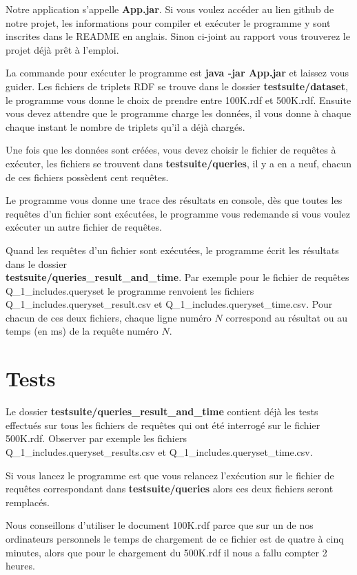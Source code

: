 \documentclass[12pt]{report}
\begin{document}
Notre application s'appelle \textbf{App.jar}. Si vous voulez accéder au lien github de notre projet, les informations pour compiler et exécuter le programme y sont inscrites dans le README en anglais. Sinon ci-joint au rapport vous trouverez le projet déjà prêt à l'emploi. 

La commande pour exécuter le programme est \textbf{java -jar App.jar} et laissez vous guider. Les fichiers de triplets RDF se trouve dans le dossier \textbf{testsuite/dataset}, le programme vous donne le choix de prendre entre 100K.rdf et 500K.rdf. Ensuite vous devez attendre que le programme charge les données, il vous donne à chaque chaque instant le nombre de triplets qu'il a déjà chargés. 

Une fois que les données sont créées, vous devez choisir le fichier de requêtes à exécuter, les fichiers se trouvent dans \textbf{testsuite/queries}, il y a en a neuf, chacun de ces fichiers possèdent cent requêtes.

Le programme vous donne une trace des résultats en console, dès que toutes les requêtes d'un fichier sont exécutées, le programme vous redemande si vous voulez exécuter un autre fichier de requêtes.

Quand les requêtes d'un fichier sont exécutées, le programme écrit les résultats dans le dossier \\
\textbf{testsuite/queries\_result\_and\_time}. Par exemple pour le fichier de requêtes \\Q\_1\_includes.queryset le programme renvoient les fichiers Q\_1\_includes.queryset\_result.csv et Q\_1\_includes.queryset\_time.csv. Pour chacun de ces deux fichiers, chaque ligne numéro $N$ correspond au résultat ou au temps (en ms) de la requête numéro $N$.

\section{Tests}
Le dossier \textbf{testsuite/queries\_result\_and\_time} contient déjà les tests effectués sur tous les fichiers de requêtes qui ont été interrogé sur le fichier 500K.rdf. Observer par exemple les fichiers \\Q\_1\_includes.queryset\_results.csv et Q\_1\_includes.queryset\_time.csv. 

Si vous lancez le programme est que vous relancez l'exécution sur le fichier de requêtes correspondant dans \textbf{testsuite/queries} alors ces deux fichiers seront remplacés.

Nous conseillons d'utiliser le document 100K.rdf parce que sur un de nos ordinateurs personnels le temps de chargement de ce fichier est de quatre à cinq minutes, alors que pour le chargement du 500K.rdf il nous a fallu compter 2 heures.
\end{document}

